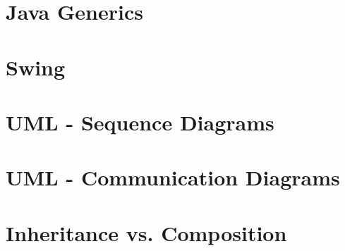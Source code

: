 \documentclass{article}
\begin{document}
\section{Java Generics}



\section{Swing}



\section{UML - Sequence Diagrams}



\section{UML - Communication Diagrams}



\section{Inheritance vs. Composition}


\end{document}
